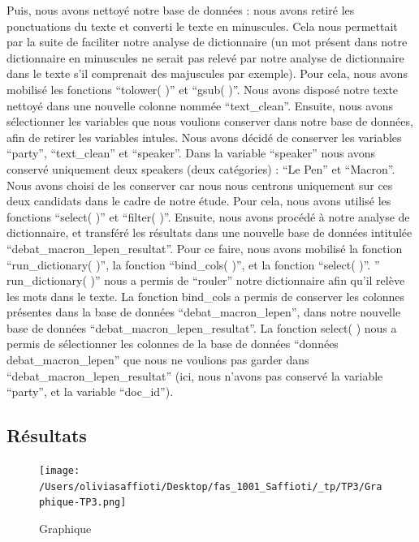 \documentclass[
  letterpaper,
  DIV=11,
  numbers=noendperiod]{scrartcl}
\begin{document}
Puis, nous avons nettoyé notre base de données : nous avons retiré les
ponctuations du texte et converti le texte en minuscules. Cela nous
permettait par la suite de faciliter notre analyse de dictionnaire (un
mot présent dans notre dictionnaire en minuscules ne serait pas relevé
par notre analyse de dictionnaire dans le texte s'il comprenait des
majuscules par exemple). Pour cela, nous avons mobilisé les fonctions
``tolower( )'' et ``gsub( )''. Nous avons disposé notre texte nettoyé
dans une nouvelle colonne nommée ``text\_clean''. Ensuite, nous avons
sélectionner les variables que nous voulions conserver dans notre base
de données, afin de retirer les variables intules. Nous avons décidé de
conserver les variables ``party'', ``text\_clean'' et ``speaker''. Dans
la variable ``speaker'' nous avons conservé uniquement deux speakers
(deux catégories) : ``Le Pen'' et ``Macron''. Nous avons choisi de les
conserver car nous nous centrons uniquement sur ces deux candidats dans
le cadre de notre étude. Pour cela, nous avons utilisé les fonctions
``select( )'' et ``filter( )''. Ensuite, nous avons procédé à notre
analyse de dictionnaire, et transféré les résultats dans une nouvelle
base de données intitulée ``debat\_macron\_lepen\_resultat''. Pour ce
faire, nous avons mobilisé la fonction ``run\_dictionary( )'', la
fonction ``bind\_cols( )'', et la fonction ``select( )''. ''
run\_dictionary( )'' nous a permis de ``rouler'' notre dictionnaire afin
qu'il relève les mots dans le texte. La fonction bind\_cols a permis de
conserver les colonnes présentes dans la base de données
``debat\_macron\_lepen'', dans notre nouvelle base de données
``debat\_macron\_lepen\_resultat''. La fonction select( ) nous a permis
de sélectionner les colonnes de la base de données ``données
debat\_macron\_lepen'' que nous ne voulions pas garder dans
``debat\_macron\_lepen\_resultat'' (ici, nous n'avons pas conservé la
variable ``party'', et la variable ``doc\_id'').

\hypertarget{ruxe9sultats}{%
\subsection{Résultats}\label{ruxe9sultats}}

\begin{figure}

{\centering \texttt{[image: /Users/oliviasaffioti/Desktop/fas\_1001\_Saffioti/\_tp/TP3/Graphique-TP3.png]}

}

\caption{Graphique}

\end{figure}
\end{document}
